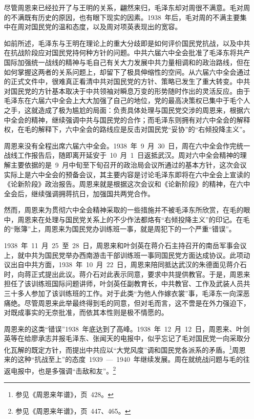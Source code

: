 尽管周恩来已经拉开了与王明的关系，翩然来归，毛泽东却对周很不满意。毛对周的不满既有历史的原因，也有眼下现实的因素。1938~年后，毛对周的不满主要集中在周对国民党的温和态度，以及周对项英表现出的宽容。

如前所述，毛泽东与王明在理论上的重大分歧即是如何评价国民党抗战，以及中共在抗战阶段应对国民党持何种方针的问题。中共六届六中全会批准了毛泽东将共产国际加强统一战线的精神与毛自己有关大力发展中共力量相调和的政治路线，但在如何掌握这两者的关系问题上，却留下了极具伸缩性的空间。从六届六中全会通过的正式文件中，很难真正看清中共对国民党的方针、策略已发生了重大转变。中共对国民党的方针基本取决于中共领袖对瞬息万变的形势随时作出的灵活反应。由于毛泽东在六届六中全会上大大加强了自己的地位，党的最高决策权已集中于毛个人之手，这就造成了极为尴尬的局面：负责具体处理与国民党交涉的周恩来，根据六中全会的精神，继续强调中共与国民党的合作；而毛泽东则拥有对六中全会的解释权，在毛的解释下，六中全会的路线应是反击对国民党“妥协”的“右倾投降主义”。

周恩来没有全程出席六届六中全会。1938~年~9~月~30~日，周在六中全会作完统一战线工作报告后，随即离开延安于~10~月~1~日返抵武汉。周对六中全会精神的理解主要依据的是~9~月中旬至下旬召开的政治局会议所通过的基本方针，这次会议实际上是六中全会的预备会议，其主要内容是讨论毛泽东即将在六中全会上宣读的《论新阶段》政治报告。周恩来就是根据这次会议和《论新阶段》的精神，在六中全会后，继续强调拥蒋抗日，加强国共两党合作。

然而，周恩来为贯彻六中全会精神采取的一些措施并不被毛泽东所欣赏，在毛的眼中，周恩来在处理与国民党关系上的不少作法都烙有“右倾投降主义”的印记。在毛的“账簿”上，周恩来为国民党办训练班一事，就是周犯下的一个严重“错误”。

1938~年~11~月~25~至~28~日，周恩来和叶剑英在蒋介石主持召开的南岳军事会议上，就中共为国民党举办西南游击干部训练班一事同国民党方面达成协议。此项动议出自中共方面，1938~年~10~月~22~日，周恩来陪同抵达武汉的朱德面见蒋介石时，向蒋正式提出此议。蒋介石对此表示同意，要求中共提供教官。于是，周恩来担任了该训练班国际问题讲师，叶剑英任副教育长，中共教官、工作及武装人员共三十多人参加了该训练班的工作。对于此类“为他人作嫁衣裳”事，毛泽东一向深恶痛绝。尽管周恩来此举最终得到毛的同意，但对毛而言，这不啻是在外力强迫下，对既成事实的无奈批准，而依其本性则是极不情愿的。

周恩来的这类“错误”1938~年底达到了高峰。1938~年~12~月~12~日，周恩来、叶剑英等在给廖承志并报毛泽东、张闻天的电报中，似乎忘记了毛对国民党一向采取分化瓦解的既定方针，而提出中共应以“大党风度”调和国民党各派系的矛盾。\footnote{参见《周恩来年谱》，页~428。}周恩来的这种“抗战至上”的态度~1939~—~1940~年继续发展。周在就统战问题与毛的往返电报中，也是多强调“击敌和友”。\footnote{参见《周恩来年谱》，页~447、465。}

